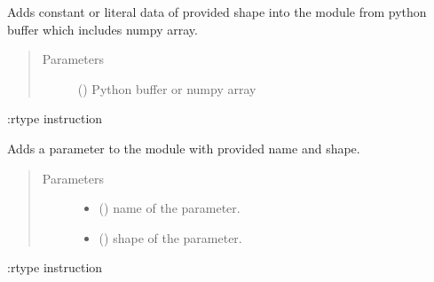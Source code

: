 \documentclass[letterpaper,10pt,english]{sphinxmanual}
\begin{document}
\begin{fulllineitems}
\label{\detokenize{reference/py:migraphx.add_literal}}
\sphinxAtStartPar
Adds constant or literal data of provided shape into the module from python buffer which includes numpy array.
\begin{quote}\begin{description}
\item[{Parameters}] \leavevmode
\sphinxAtStartPar
{} () \textendash{} Python buffer or numpy array

\end{description}\end{quote}

\sphinxAtStartPar
:rtype instruction

\end{fulllineitems}


\begin{fulllineitems}
\label{\detokenize{reference/py:migraphx.add_parameter}}
\sphinxAtStartPar
Adds a parameter to the module with provided name and shape.
\begin{quote}\begin{description}
\item[{Parameters}] \leavevmode\begin{itemize}
\item {} 
\sphinxAtStartPar
{} () \textendash{} name of the parameter.

\item {} 
\sphinxAtStartPar
{} ({\hyperref[\detokenize{reference/py:migraphx.shape}]{}}) \textendash{} shape of the parameter.

\end{itemize}

\end{description}\end{quote}

\sphinxAtStartPar
:rtype instruction

\end{fulllineitems}
\end{document}
